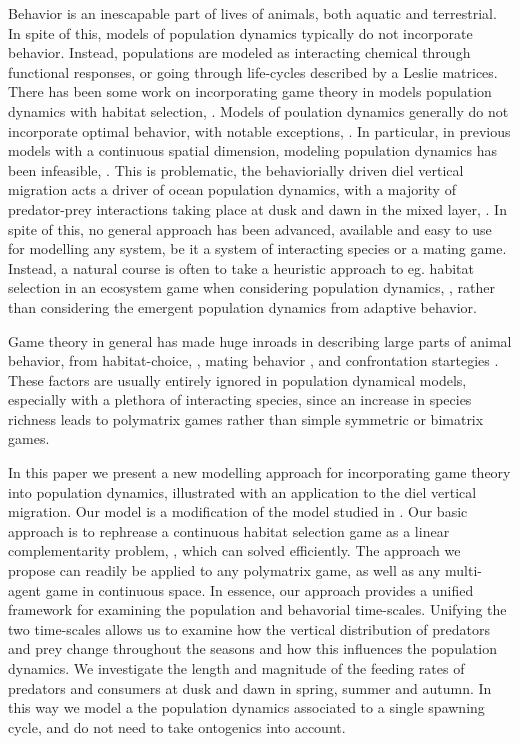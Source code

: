 Behavior is an inescapable part of lives of animals, both aquatic and terrestrial. In spite of this, models of population dynamics typically do not incorporate behavior. Instead, populations are modeled as interacting chemical through functional responses, or going through life-cycles described by a Leslie matrices. There has been some work on incorporating game theory in models population dynamics with habitat selection, \citep{krivan,idealfreedistribution}. Models of poulation dynamics generally do not incorporate optimal behavior, with notable exceptions, \citep{Krivan1998,genkai2007macrophyte}. In particular, in previous models with a continuous spatial dimension, modeling population dynamics has been infeasible, \citep{pinti2019trophic}. This is problematic, the behaviorially driven diel vertical migration acts a driver of ocean population dynamics, with a majority of predator-prey interactions taking place at dusk and dawn in the mixed layer, \citep{benoit2014critical}.
In spite of this, no general approach has been advanced, available and easy to use for modelling any system, be it a system of interacting species or a mating game. Instead, a natural course is often to take a heuristic approach to eg. habitat selection in an ecosystem game when considering population dynamics, \citep{ho2019}, rather than considering the emergent population dynamics from adaptive behavior.


Game theory in general has made huge inroads in describing large parts of animal behavior,  from habitat-choice, \citep{idealfreedistribution}, mating behavior  \citep{battleofthesexes}, and confrontation startegies \citep{hawkdove}. These factors are usually entirely ignored in population dynamical models, especially with a plethora of interacting species, since an increase in species richness leads to polymatrix games rather than simple symmetric or bimatrix games.

In this paper we present a new modelling approach for incorporating game theory into population dynamics, illustrated with an application to the diel vertical migration. Our model is a modification of the model studied in \citep{verticalmigration}. Our basic approach is to rephrease a continuous habitat selection game as a linear complementarity problem, \citep{miller1991copositive}, which can solved efficiently. The approach we propose can readily be applied to any polymatrix game, as well as any multi-agent game in continuous space. In essence, our approach provides a unified framework for examining the population and behavorial time-scales.  Unifying the two time-scales allows us to examine how the vertical distribution of predators and prey change throughout the seasons and how this influences the population dynamics. We investigate the length and magnitude of the feeding rates of predators and consumers at dusk and dawn in spring, summer and autumn. In this way we model a the population dynamics associated to a single spawning cycle, and do not need to take ontogenics into account.

